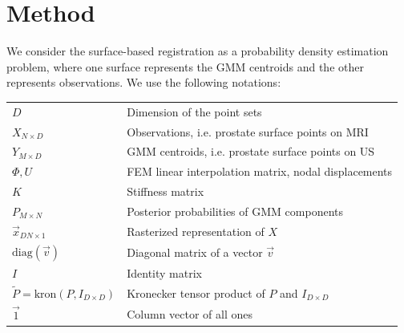 \documentclass[runningheads,a4paper]{llncs}
\newcommand{\diag}{\mathrm{diag}}
\newcommand{\kron}{\mathrm{kron}}
\begin{document}
\section{Method}
We consider the surface-based registration as a probability density estimation problem, where one surface represents the GMM centroids and the other represents observations. We use the following notations: 
\smallskip

\noindent\begin{tabular}{lp{}}
  \hline
  $D$ & Dimension of the point sets\\
  $X_{N\times D}$ & Observations, i.e. prostate surface points on MRI\\
  $Y_{M\times D}$ & GMM centroids, i.e. prostate surface points on US\\
  $\Phi,U$ & FEM linear interpolation matrix, nodal displacements\\
  $K$ & Stiffness matrix\\
  $P_{M\times N}$ & Posterior probabilities of GMM components\\
  $\vec{x}_{DN \times 1}$ & Rasterized representation of $X$\\
  $\diag{(\vec{v})}$ & Diagonal matrix of a vector $\vec{v}$\\
  $I$ & Identity matrix\\
  $\tilde{P} = \kron{(P,I_{D\times{D}})}$ & Kronecker tensor product of $P$ and $I_{D\times{D}}$\\
  $\vec{1}$ & Column vector of all ones\\
  \hline
\end{tabular}
\end{document}
